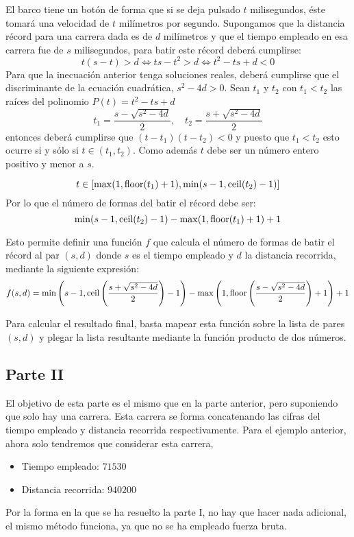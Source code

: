\documentclass[a4paper,12pt]{article}
\begin{document}
El barco tiene un botón de forma que si se deja pulsado $t$ milisegundos, éste tomará una velocidad de $t$ milímetros por segundo. Supongamos que la distancia récord para una carrera dada es de $d$ milímetros y que el tiempo empleado en esa carrera fue de $s$ milisegundos, para batir este récord deberá cumplirse:
$$t(s-t) > d \Longleftrightarrow ts -t^2>d \Longleftrightarrow t^2-ts+d<0$$
Para que la inecuación anterior tenga soluciones reales, deberá cumplirse que el discriminante de la ecuación cuadrática, $s^2-4d>0$. Sean $t_1$ y $t_2$ con $t_1<t_2$ las raíces del polinomio $P(t)=t^2-ts+d$
$$t_1 = \frac{s-\sqrt{s^2-4d}}{2}, \quad t_2 = \frac{s+\sqrt{s^2-4d}}{2}$$
entonces deberá cumplirse que $(t-t_1)(t-t_2)<0$ y puesto que $t_1< t_2$ esto ocurre si y sólo si $t\in (t_1, t_2)$. Como además $t$ debe ser un número entero positivo y menor a $s$.

$$t\in\left[\max(1,\operatorname{\rm floor}(t_1)+1), \min(s-1,\operatorname{\rm ceil}(t_2) -1 )\right]$$
Por lo que el número de formas del batir el récord debe ser:
$$\min(s-1,\operatorname{\rm ceil}(t_2) -1 ) - \max(1,\operatorname{\rm floor}(t_1)+1) + 1$$

Esto permite definir una función $f$ que calcula el número de formas de batir el récord al par $(s,d)$ donde $s$ es el tiempo empleado y $d$ la distancia recorrida, mediante la siguiente expresión:
$$f(s,d)=\min\left(s-1,\operatorname{\rm ceil}\left(\frac{s+\sqrt{s^2-4d}}{2}\right) -1 \right) - \max\left(1,\operatorname{\rm floor}\left(\frac{s-\sqrt{s^2-4d}}{2}\right)+1\right) + 1$$

Para calcular el resultado final, basta mapear esta función sobre la lista de pares $(s,d)$ y plegar la lista resultante mediante la función producto de dos números.

\subsection{Parte II}
El objetivo de esta parte es el mismo que en la parte anterior, pero suponiendo que solo hay una carrera. Esta carrera se forma concatenando las cifras del tiempo empleado y distancia recorrida respectivamente. Para el ejemplo anterior, ahora solo tendremos que considerar esta carrera,

\begin{itemize}
    \item Tiempo empleado: $71530$
    \item Distancia recorrida: $940200$
\end{itemize}

Por la forma en la que se ha resuelto la parte I, no hay que hacer nada adicional, el mismo método funciona, ya que no se ha empleado fuerza bruta.
\end{document}
